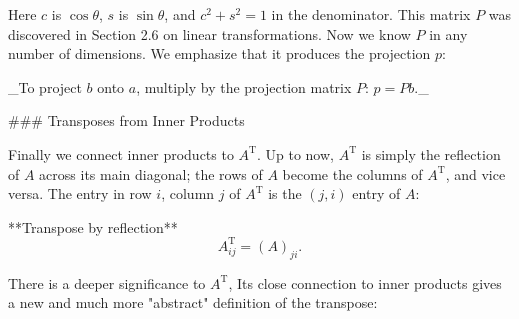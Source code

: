 Here \(c\) is \(\cos\theta\), \(s\) is \(\sin\theta\), and \(c^{2}+s^{2}=1\) in the denominator. This matrix \(P\) was discovered in Section 2.6 on linear transformations. Now we know \(P\) in any number of dimensions. We emphasize that it produces the projection \(p\):

_To project \(b\) onto \(a\), multiply by the projection matrix \(P\): \(p=Pb\)._

### Transposes from Inner Products

Finally we connect inner products to \(A^{\mathrm{T}}\). Up to now, \(A^{\mathrm{T}}\) is simply the reflection of \(A\) across its main diagonal; the rows of \(A\) become the columns of \(A^{\mathrm{T}}\), and vice versa. The entry in row \(i\), column \(j\) of \(A^{\mathrm{T}}\) is the \((j,i)\) entry of \(A\):

**Transpose by reflection**\[A^{\mathrm{T}}_{ij}=(A)_{ji}.\]

There is a deeper significance to \(A^{\mathrm{T}}\), Its close connection to inner products gives a new and much more "abstract" definition of the transpose: 